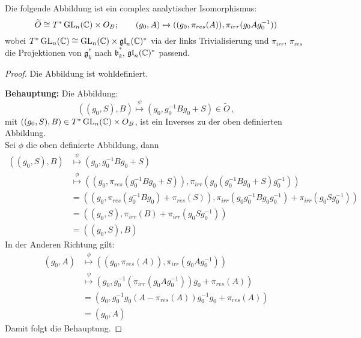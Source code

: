 \begin{lem}  
Die folgende Abbildung ist ein complex analytischer Isomorphismus:
\[
\widetilde O\cong T^*\operatorname{GL}_n(\mathbb{C})\times O_B;\qquad 
  (g_0,A)\mapsto ((g_0,\pi_{res}(A)),\pi_{irr}(g_0Ag_0^{-1}))
\]
wobei $T^*\operatorname{GL}_n(\mathbb{C})\cong \operatorname{GL}_n(\mathbb{C})\times\mathfrak{gl}_n(\mathbb{C})^*$ via der links
Trivialisierung und $\pi_{irr}$, $\pi_{res}$ die Projektionen von $\mathfrak
g_k^*$ nach $\mathfrak b_k^*$, $\mathfrak{gl}_n(\mathbb{C})^*$ passend.
\end{lem}
\begin{proof}
Die Abbildung ist wohldefiniert.
\begin{comment}
denn??
\end{comment}
\textbf{Behauptung:} Die Abbildung:
\[
((g_0,S),B)\overset\psi\mapsto(g_0,g_0^{-1}Bg_0+S)\in\tilde O \,,
\]
mit $((g_0,S),B)\in T^*\operatorname{GL}_n(\mathbb{C})\times O_B$, ist ein Inverses zu der oben
definierten Abbildung.\\
Sei $\phi$ die oben definierte Abbildung, dann
\begin{align*}
((g_0,S),B)&\overset\psi\mapsto(g_0,g_0^{-1}Bg_0+S)
\\&\overset\phi\mapsto((g_0,\pi_{res}(g_0^{-1}Bg_0+S)),
    \pi_{irr}(g_0(g_0^{-1}Bg_0+S)g_0^{-1}))
\\&=((g_0,\pi_{res}(g_0^{-1}Bg_0)+\pi_{res}(S)),
    \pi_{irr}( g_0g_0^{-1}Bg_0g_0^{-1})+\pi_{irr}(g_0Sg_0^{-1}))
\\&=((g_0,S), \pi_{irr}(B)+ \pi_{irr}(g_0Sg_0^{-1}))
\\&=((g_0,S), B)
\end{align*}
In der Anderen Richtung gilt:
\begin{align*}
(g_0,A)&\overset\phi\mapsto ((g_0,\pi_{res}(A)),\pi_{irr}(g_0Ag_0^{-1}))
\\&\overset\psi\mapsto (g_0,g_0^{-1}(\pi_{irr}(g_0Ag_0^{-1}))g_0+\pi_{res}(A))
\\&= (g_0,g_0^{-1}g_0(A - \pi_{res}(A))g_0^{-1}g_0+\pi_{res}(A))
\\&= (g_0,A)
\end{align*}
Damit folgt die Behauptung.
\end{proof}

